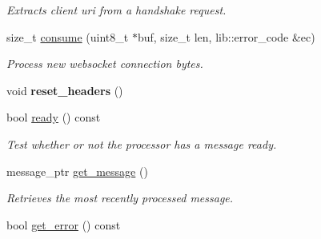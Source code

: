 \begin{DoxyCompactItemize}
\begin{DoxyCompactList}\small\item\em Extracts client uri from a handshake request. \end{DoxyCompactList}\item 
size\+\_\+t \hyperlink{classwebsocketpp_1_1processor_1_1hybi13_a5c5e3234a0067c7f14fe0ceb4e647659}{consume} (uint8\+\_\+t $\ast$buf, size\+\_\+t len, lib\+::error\+\_\+code \&ec)
\begin{DoxyCompactList}\small\item\em Process new websocket connection bytes. \end{DoxyCompactList}\item 
void {\bfseries reset\+\_\+headers} ()\hypertarget{classwebsocketpp_1_1processor_1_1hybi13_a052dd867709539c0a3f70eb271da70ca}{}\label{classwebsocketpp_1_1processor_1_1hybi13_a052dd867709539c0a3f70eb271da70ca}

\item 
bool \hyperlink{classwebsocketpp_1_1processor_1_1hybi13_af0e73b14cac728a873c8b5c0bc82ed03}{ready} () const\hypertarget{classwebsocketpp_1_1processor_1_1hybi13_af0e73b14cac728a873c8b5c0bc82ed03}{}\label{classwebsocketpp_1_1processor_1_1hybi13_af0e73b14cac728a873c8b5c0bc82ed03}

\begin{DoxyCompactList}\small\item\em Test whether or not the processor has a message ready. \end{DoxyCompactList}\item 
message\+\_\+ptr \hyperlink{classwebsocketpp_1_1processor_1_1hybi13_a8fe09bba8cbe2821ef5c7cf3fd9573cd}{get\+\_\+message} ()
\begin{DoxyCompactList}\small\item\em Retrieves the most recently processed message. \end{DoxyCompactList}\item 
bool \hyperlink{classwebsocketpp_1_1processor_1_1hybi13_a6f95f4d45deb00fab39d1fe4441256be}{get\+\_\+error} () const\hypertarget{classwebsocketpp_1_1processor_1_1hybi13_a6f95f4d45deb00fab39d1fe4441256be}{}\label{classwebsocketpp_1_1processor_1_1hybi13_a6f95f4d45deb00fab39d1fe4441256be}


\end{DoxyCompactItemize}
